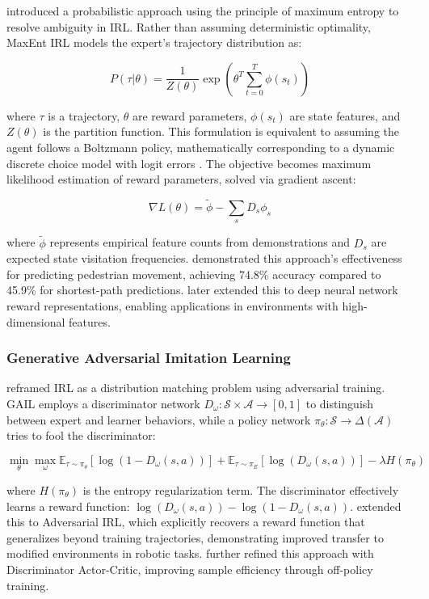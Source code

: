 \citet{Ziebart2008} introduced a probabilistic approach using the principle of maximum entropy to resolve ambiguity in IRL. Rather than assuming deterministic optimality, MaxEnt IRL models the expert's trajectory distribution as:

$$P(\tau|\theta) = \frac{1}{Z(\theta)} \exp(\theta^T \sum_{t=0}^T \phi(s_t))$$

\noindent where $\tau$ is a trajectory, $\theta$ are reward parameters, $\phi(s_t)$ are state features, and $Z(\theta)$ is the partition function. This formulation is equivalent to assuming the agent follows a Boltzmann policy, mathematically corresponding to a dynamic discrete choice model with logit errors \citep{Ermon2015}. The objective becomes maximum likelihood estimation of reward parameters, solved via gradient ascent:

$$\nabla L(\theta) = \tilde{\phi} - \sum_s D_s \phi_s$$

\noindent where $\tilde{\phi}$ represents empirical feature counts from demonstrations and $D_s$ are expected state visitation frequencies. \citet{Ziebart2008} demonstrated this approach's effectiveness for predicting pedestrian movement, achieving 74.8\% accuracy compared to 45.9\% for shortest-path predictions. \citet{Wulfmeier2015} later extended this to deep neural network reward representations, enabling applications in environments with high-dimensional features.

\subsubsection{Generative Adversarial Imitation Learning}

\citet{Ho2016} reframed IRL as a distribution matching problem using adversarial training. GAIL employs a discriminator network $D_\omega: \mathcal{S} \times \mathcal{A} \rightarrow [0,1]$ to distinguish between expert and learner behaviors, while a policy network $\pi_\theta: \mathcal{S} \rightarrow \Delta(\mathcal{A})$ tries to fool the discriminator:

$$\min_\theta \max_\omega \mathbb{E}_{\tau \sim \pi_\theta}[\log(1 - D_\omega(s,a))] + \mathbb{E}_{\tau \sim \pi_E}[\log(D_\omega(s,a))] - \lambda H(\pi_\theta)$$

\noindent where $H(\pi_\theta)$ is the entropy regularization term. The discriminator effectively learns a reward function: $\log(D_\omega(s,a)) - \log(1 - D_\omega(s,a))$. \citet{Fu2018} extended this to Adversarial IRL, which explicitly recovers a reward function that generalizes beyond training trajectories, demonstrating improved transfer to modified environments in robotic tasks. \citet{Kostrikov2018} further refined this approach with Discriminator Actor-Critic, improving sample efficiency through off-policy training.


